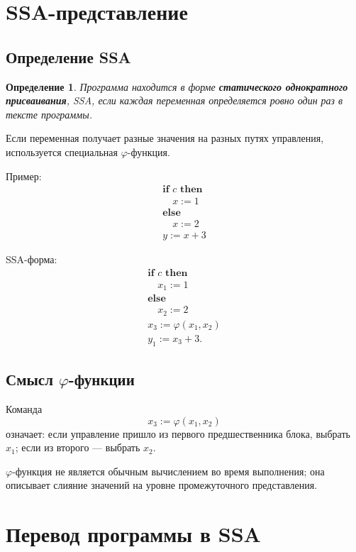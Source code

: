 \documentclass[12pt,a4paper]{article}
\newtheorem{definition}{Определение}
\begin{document}
\section{SSA-представление}

\subsection{Определение SSA}

\begin{definition}
Программа находится в форме \textbf{статического однократного присваивания}, SSA, если каждая переменная определяется ровно один раз в тексте программы.
\end{definition}

Если переменная получает разные значения на разных путях управления, используется специальная $\varphi$-функция.

Пример:
\[
\begin{array}{l}
\textbf{if } c \textbf{ then}\\
\quad x := 1\\
\textbf{else}\\
\quad x := 2\\
y := x+3
\end{array}
\]

SSA-форма:
\[
\begin{array}{l}
\textbf{if } c \textbf{ then}\\
\quad x_1 := 1\\
\textbf{else}\\
\quad x_2 := 2\\
x_3 := \varphi(x_1,x_2)\\
y_1 := x_3+3.
\end{array}
\]

\subsection{Смысл $\varphi$-функции}

Команда
\[
x_3 := \varphi(x_1,x_2)
\]
означает: если управление пришло из первого предшественника блока, выбрать $x_1$; если из второго --- выбрать $x_2$.

$\varphi$-функция не является обычным вычислением во время выполнения; она описывает слияние значений на уровне промежуточного представления.

\section{Перевод программы в SSA}
\end{document}
